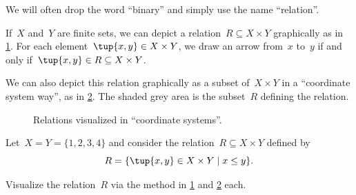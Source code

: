\begin{remark}
  We will often drop the word ``binary'' and simply use the name ``relation''.
\end{remark}


If~$X$ and~$Y$ are finite sets, we can depict a relation~$R \subseteq X \times Y$ graphically as in \cref{fig:example_rel}. For each element~$\tup{x,y} \in X \times Y$, we draw an arrow from~$x$ to~$y$ if and only if~$\tup{x,y} \in R \subseteq X \times Y$.

\begin{figure}[h!]
  \centering
  \caption{}
  \label{fig:example_rel}
\end{figure}

We can also depict this relation graphically as a subset of~$X \times Y$ in a ``coordinate system way'', as in \cref{fig:example_rel_coord}. The shaded grey area is the subset~$R$ defining the relation.

\begin{figure}[h!]
  \begin{center}
  \end{center}
  \caption{Relations visualized in ``coordinate systems''.}
  \label{fig:example_rel_coord}
\end{figure}

\begin{exercise}
  Let~$X = Y = \{1, 2, 3, 4 \}$ and consider the relation~$R \subseteq X \times Y$ defined by
  \begin{equation}
    R = \{ \tup{x,y} \in X \times Y \mid x \leq y \}.
  \end{equation}

  Visualize the relation~$R$ via the method in \cref{fig:example_rel} and \cref{fig:example_rel_coord} each.
\end{exercise}

